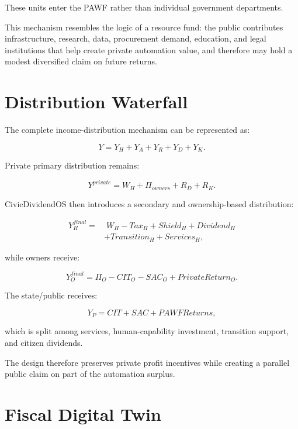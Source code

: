 \documentclass[conference]{IEEEtran}
\begin{document}
These units enter the PAWF rather than individual government departments.

This mechanism resembles the logic of a resource fund: the public contributes
infrastructure, research, data, procurement demand, education, and legal
institutions that help create private automation value, and therefore may hold
a modest diversified claim on future returns.

\section{Distribution Waterfall}

The complete income-distribution mechanism can be represented as:

\begin{equation}
Y = Y_H + Y_A + Y_R + Y_D + Y_K.
\end{equation}

Private primary distribution remains:

\begin{equation}
Y^{private} =
W_H + \Pi_{owners} + R_D + R_K.
\end{equation}

CivicDividendOS then introduces a secondary and ownership-based distribution:

\begin{align}
Y_H^{final} =&\;
W_H - Tax_H + Shield_H + Dividend_H \nonumber\\
&+Transition_H + Services_H,
\end{align}

while owners receive:

\begin{equation}
Y_O^{final}
=
\Pi_O - CIT_O - SAC_O + PrivateReturn_O.
\end{equation}

The state/public receives:

\begin{equation}
Y_P =
CIT + SAC + PAWFReturns,
\end{equation}

which is split among services, human-capability investment, transition support,
and citizen dividends.

The design therefore preserves private profit incentives while creating a
parallel public claim on part of the automation surplus.

\section{Fiscal Digital Twin}
\end{document}

